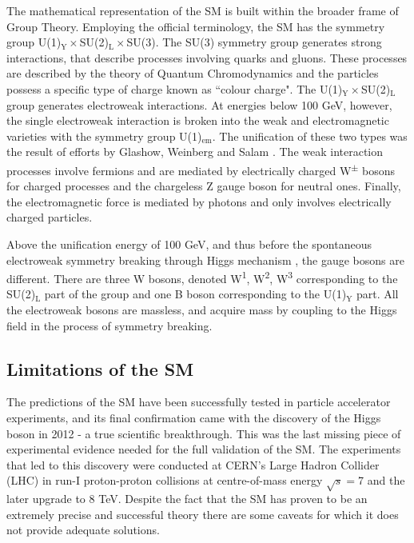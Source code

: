 The mathematical representation of the SM is built within the broader frame of Group Theory. Employing the official terminology, the SM has the symmetry group U(1)$_{\text{Y}}\times$SU(2)$_{\text{L}}\times$SU(3). The SU(3) symmetry group generates strong interactions, that describe processes involving quarks and gluons. These processes are described by the theory of Quantum Chromodynamics and the particles possess a specific type of charge known as ``colour charge".
The U(1)$_{\text{Y}}\times$SU(2)$_{\text{L}}$ group generates electroweak interactions. At energies below 100 GeV, however, the single electroweak interaction is broken into the weak and electromagnetic varieties with the symmetry group U(1)$_{\text{em}}$. 
The unification of these two types was the result of efforts by Glashow, Weinberg and Salam \citep{Glashow:1961tr,weinberg1967model,salam1968elementary}. 
The weak interaction processes involve fermions and are mediated by electrically charged W\textsuperscript{$\pm$} bosons for charged processes and the chargeless Z gauge boson for neutral ones. Finally, the electromagnetic force is mediated by photons and only involves electrically charged particles. 

Above the unification energy of 100 GeV, and thus before the spontaneous electroweak symmetry breaking  through Higgs mechanism \citep{englert1964broken, higgs1964broken}, the gauge bosons are different. There are three W bosons, denoted W\textsuperscript{1}, W\textsuperscript{2}, W\textsuperscript{3} corresponding to the SU(2)$_{\text{L}}$ part of the group and one B boson corresponding to the U(1)$_{\text{Y}}$ part. 
All the electroweak bosons are massless, and acquire mass by coupling to the Higgs field in the process of symmetry breaking.  

\subsection{Limitations of the SM}

The predictions of the SM have been successfully tested in particle accelerator experiments, and its final confirmation came with the discovery of the Higgs boson in 2012 - a true scientific breakthrough. This was the last missing piece of experimental evidence needed for the full validation of the SM. The experiments that led to this discovery were conducted at CERN’s Large Hadron Collider (LHC) in run-I proton-proton collisions at centre-of-mass energy $\sqrt{s}=$7 and the later upgrade to 8 TeV.  
Despite the fact that the SM has proven to be an extremely precise and successful theory there are some caveats for which it does not provide  adequate solutions. 

